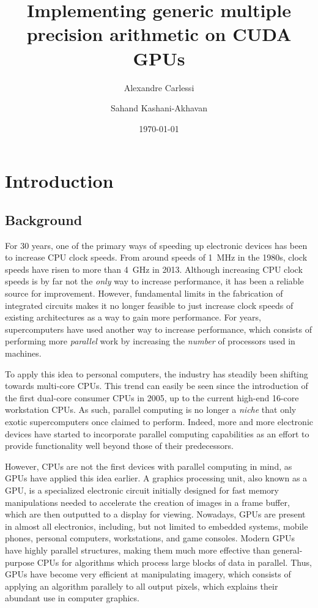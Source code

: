 \documentclass[12pt, a4paper]{report}
\newcommand{\mytitle}{\small Implementing generic multiple precision arithmetic on CUDA GPUs}
\begin{document}
\title{\mytitle}
\author{Alexandre Carlessi \and Sahand Kashani-Akhavan}
\date{\today}



\tableofcontents

\begin{sloppypar}

\chapter{Introduction}
\section{Background}
For 30 years, one of the primary ways of speeding up electronic devices has been
to increase CPU clock speeds.
From around speeds of 1~MHz in the 1980s, clock speeds have risen to more than
4~GHz in 2013.
Although increasing CPU clock speeds is by far not the \emph{only} way to
increase performance, it has been a reliable source for improvement.
However, fundamental limits in the fabrication of integrated circuits makes it
no longer feasible to just increase clock speeds of existing architectures as a
way to gain more performance.
For years, supercomputers have used another way to increase performance, which
consists of performing more \emph{parallel} work by increasing the \emph{number}
of processors used in machines.

To apply this idea to personal computers, the industry has steadily been
shifting towards multi-core CPUs.
This trend can easily be seen since the introduction of the first dual-core
consumer CPUs in 2005, up to the current high-end 16-core workstation CPUs.
As such, parallel computing is no longer a \emph{niche} that only exotic
supercomputers once claimed to perform.
Indeed, more and more electronic devices have started to incorporate parallel
computing capabilities as an effort to provide functionality well beyond those
of their predecessors.

However, CPUs are not the first devices with parallel computing in mind, as GPUs
have applied this idea earlier.
A graphics processing unit, also known as a GPU, is a specialized electronic
circuit initially designed for fast memory manipulations needed to accelerate
the creation of images in a frame buffer, which are then outputted to a display
for viewing.
Nowadays, GPUs are present in almost all electronics, including, but not limited
to embedded systems, mobile phones, personal computers, workstations, and game
consoles.
Modern GPUs have highly parallel structures, making them much more effective
than general-purpose CPUs for algorithms which process large blocks of data in
parallel.
Thus, GPUs have become very efficient at manipulating imagery, which consists
of applying an algorithm parallely to all output pixels, which explains their
abundant use in computer graphics.


\end{sloppypar}
\end{document}

